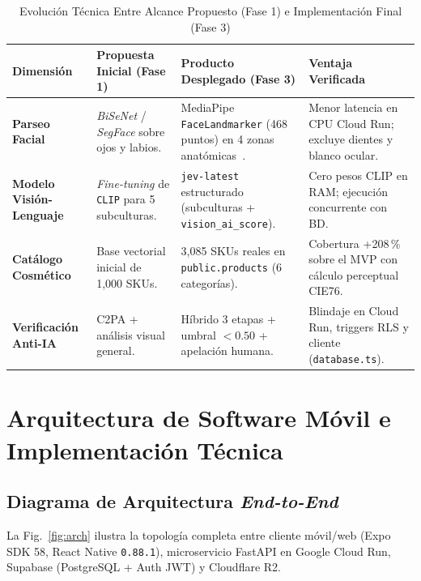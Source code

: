 \documentclass[conference]{IEEEtran}
\begin{document}
\begin{table}[t]
\centering
\caption{Evolución Técnica Entre Alcance Propuesto (Fase 1) e Implementación Final (Fase 3)}
\label{tab:pivotes}
\renewcommand{\arraystretch}{1.18}
\begin{tabularx}{\textwidth}{>{\bfseries}p{2.9cm} p{4.0cm} p{4.6cm} X}
\toprule
Dimensión & Propuesta Inicial (Fase 1) & Producto Desplegado (Fase 3) & Ventaja Verificada \\
\midrule
Parseo Facial & \textit{BiSeNet} / \textit{SegFace} sobre ojos y labios. & MediaPipe \texttt{FaceLandmarker} (468 puntos) en 4 zonas anatómicas~\cite{ref20}. & Menor latencia en CPU Cloud Run; excluye dientes y blanco ocular. \\
Modelo Visión-Lenguaje & \textit{Fine-tuning} de \texttt{CLIP} para 5 subculturas. & \texttt{jev-latest} estructurado (subculturas + \texttt{vision\_ai\_score}). & Cero pesos CLIP en RAM; ejecución concurrente con BD. \\
Catálogo Cosmético & Base vectorial inicial de 1,000 SKUs. & 3,085 SKUs reales en \texttt{public.products} (6 categorías). & Cobertura +208\,\% sobre el MVP con cálculo perceptual CIE76. \\
Verificación Anti-IA & C2PA + análisis visual general. & Híbrido 3 etapas + umbral $< 0.50$ + apelación humana. & Blindaje en Cloud Run, triggers RLS y cliente (\texttt{database.ts}). \\
\bottomrule
\end{tabularx}
\end{table}

\section{Arquitectura de Software Móvil e Implementación Técnica}

\subsection{Diagrama de Arquitectura \textit{End-to-End}}
La Fig.~\ref{fig:arch} ilustra la topología completa entre cliente móvil/web (Expo SDK 58, React Native \texttt{0.88.1}), microservicio FastAPI en Google Cloud Run, Supabase (PostgreSQL + Auth JWT) y Cloudflare R2.
\end{document}
